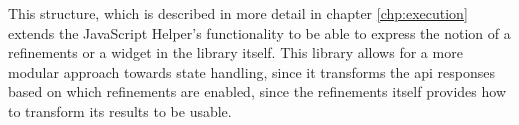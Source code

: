 This structure, which is described in more detail in chapter \ref{chp:execution} extends the JavaScript Helper's functionality to be able to express the notion of a \glspl{refinement} or a widget in the library itself. This library allows for a more modular approach towards state handling, since it transforms the \acrshort{api} responses based on which \glspl{refinement} are enabled, since the \glspl{refinement} itself provides how to transform its results to be usable.


